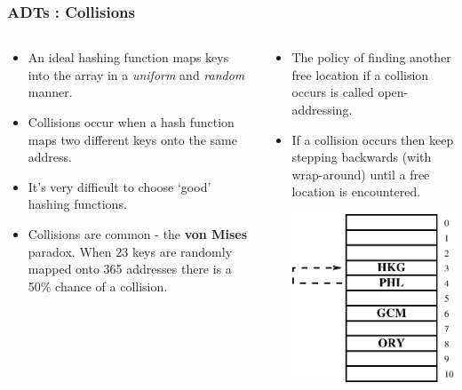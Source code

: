 
\begin{frame}[fragile]
\frametitle{ADTs : Collisions}
\begin{columns}[T]

\begin{column}{0.45\textwidth}
\begin{itemize}[<+->]
\item An ideal hashing function maps keys into the array in a {\it uniform} and {\it random} manner.
\item Collisions occur when a hash function maps two different keys onto the same address.
\item It's very difficult to choose `good' hashing functions.
\item Collisions are common - the {\bf von Mises} paradox. When 23 keys are randomly mapped onto 365 addresses there is a 50\% chance of a collision.
\end{itemize}
\end{column}

\pause
\begin{column}{0.45\textwidth}
\begin{itemize}[<+->]
\item The policy of finding another free location if a collision occurs is called open-addressing.
\item If a collision occurs then keep stepping backwards (with wrap-around) until a free location is encountered.
\pause
\begin{center}
\includegraphics[height=0.3333\textheight]{../Images/hashprobe.pdf}
\end{center}
\end{itemize}
\end{column}

\end{columns}
\end{frame}

